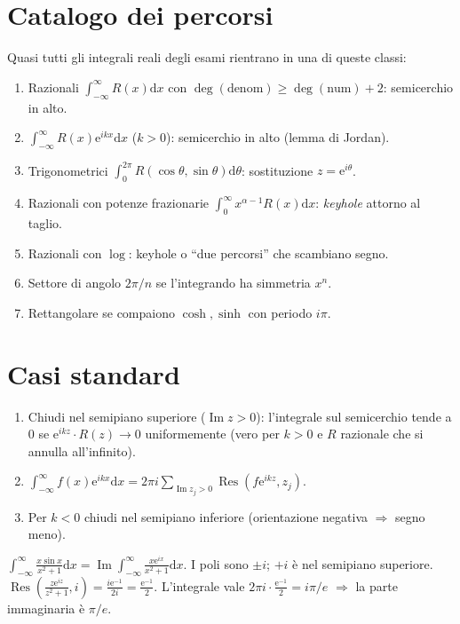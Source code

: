 \documentclass[11pt,a4paper,openany]{book}
\theoremstyle{definition}
\newcommand{\dd}{\mathrm{d}}
\newcommand{\eu}{\mathrm{e}}
\renewcommand{\Im}{\operatorname{Im}}
\DeclareMathOperator{\Res}{Res}
\begin{document}
\section{Catalogo dei percorsi}
Quasi tutti gli integrali reali degli esami rientrano in una di queste classi:
\begin{enumerate}
\item Razionali $\int_{-\infty}^\infty R(x)\dd x$ con $\deg(\text{denom})\ge\deg(\text{num})+2$: semicerchio in alto.
\item $\int_{-\infty}^\infty R(x)\eu^{i k x}\dd x$ ($k>0$): semicerchio in alto (lemma di Jordan).
\item Trigonometrici $\int_0^{2\pi}R(\cos\theta,\sin\theta)\dd\theta$: sostituzione $z=\eu^{i\theta}$.
\item Razionali con potenze frazionarie $\int_0^\infty x^{\alpha-1}R(x)\dd x$: \emph{keyhole} attorno al taglio.
\item Razionali con $\log$: keyhole o ``due percorsi'' che scambiano segno.
\item Settore di angolo $2\pi/n$ se l'integrando ha simmetria $x^n$.
\item Rettangolare se compaiono $\cosh,\sinh$ con periodo $i\pi$.
\end{enumerate}

\section{Casi standard}

\begin{algoritmo}
\begin{enumerate}
\item Chiudi nel semipiano superiore ($\Im z>0$): l'integrale sul semicerchio tende a $0$ se $\eu^{ikz}\cdot R(z)\to 0$ uniformemente (vero per $k>0$ e $R$ razionale che si annulla all'infinito).
\item $\int_{-\infty}^\infty\!\! f(x)\eu^{ikx}\dd x=2\pi i\sum_{\Im z_j>0}\Res(f\eu^{ikz},z_j)$.
\item Per $k<0$ chiudi nel semipiano inferiore (orientazione negativa $\Rightarrow$ segno meno).
\end{enumerate}
\end{algoritmo}

\begin{esempio}[Scritto 18/06/2024, Es. 2]
$\displaystyle\int_{-\infty}^\infty\frac{x\sin x}{x^2+1}\dd x=\Im\int_{-\infty}^\infty\frac{x\eu^{ix}}{x^2+1}\dd x$. I poli sono $\pm i$; $+i$ \`e nel semipiano superiore.
$\Res\!\left(\tfrac{z\eu^{iz}}{z^2+1},i\right)=\tfrac{i\eu^{-1}}{2i}=\tfrac{\eu^{-1}}{2}$. L'integrale vale $2\pi i\cdot\tfrac{\eu^{-1}}{2}=i\pi/e$ $\Rightarrow$ la parte immaginaria \`e $\pi/e$.
\end{esempio}
\end{document}
